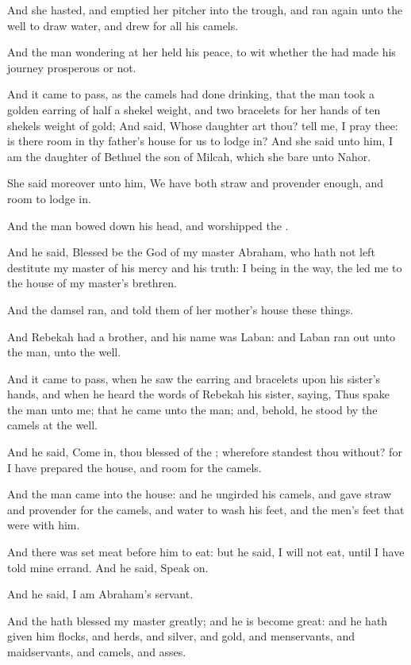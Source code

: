 \verse And she hasted, and emptied her pitcher into the trough, and ran again unto the well to draw water, and drew for all his camels.

\verse And the man wondering at her held his peace, to wit whether the \LORD had made his journey prosperous or not.

\verse And it came to pass, as the camels had done drinking, that the man took a golden earring of half a shekel weight, and two bracelets for her hands of ten shekels weight of gold; \verse And said, Whose daughter art thou? tell me, I pray thee: is there room in thy father's house for us to lodge in?  \verse And she said unto him, I am the daughter of Bethuel the son of Milcah, which she bare unto Nahor.

\verse She said moreover unto him, We have both straw and provender enough, and room to lodge in.

\verse And the man bowed down his head, and worshipped the \LORD.

\verse And he said, Blessed be the \LORD God of my master Abraham, who hath not left destitute my master of his mercy and his truth: I being in the way, the \LORD led me to the house of my master's brethren.

\verse And the damsel ran, and told them of her mother's house these things.

\verse And Rebekah had a brother, and his name was Laban: and Laban ran out unto the man, unto the well.

\verse And it came to pass, when he saw the earring and bracelets upon his sister's hands, and when he heard the words of Rebekah his sister, saying, Thus spake the man unto me; that he came unto the man; and, behold, he stood by the camels at the well.

\verse And he said, Come in, thou blessed of the \LORD; wherefore standest thou without? for I have prepared the house, and room for the camels.

\verse And the man came into the house: and he ungirded his camels, and gave straw and provender for the camels, and water to wash his feet, and the men's feet that were with him.

\verse And there was set meat before him to eat: but he said, I will not eat, until I have told mine errand. And he said, Speak on.

\verse And he said, I am Abraham's servant.

\verse And the \LORD hath blessed my master greatly; and he is become great: and he hath given him flocks, and herds, and silver, and gold, and menservants, and maidservants, and camels, and asses.

